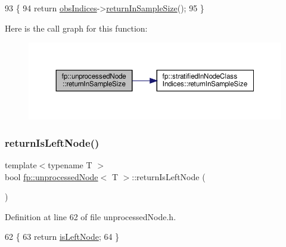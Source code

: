 \begin{DoxyCode}
93                                                \{
94                     \textcolor{keywordflow}{return} \hyperlink{classfp_1_1unprocessedNode_aba9f03124658f62906fa8ded53cef535}{obsIndices}->\hyperlink{classfp_1_1stratifiedInNodeClassIndices_a596235ffec7250fabd2818d395b39c66}{returnInSampleSize}();
95                 \}
\end{DoxyCode}
Here is the call graph for this function\+:
\nopagebreak
\begin{figure}[H]
\begin{center}
\leavevmode
\includegraphics[width=350pt]{classfp_1_1unprocessedNode_a5243ac02610f01c6b0df9d5fd6f6f857_cgraph}
\end{center}
\end{figure}
\mbox{\label{classfp_1_1unprocessedNode_a0c26b122691d15592ce80875bf8920b5}} 
\subsubsection{\texorpdfstring{return\+Is\+Left\+Node()}{returnIsLeftNode()}\hspace{0.1cm}{\footnotesize\ttfamily [1/2]}}
{\footnotesize\ttfamily template$<$typename T $>$ \\
bool \hyperlink{classfp_1_1unprocessedNode}{fp\+::unprocessed\+Node}$<$ T $>$\+::return\+Is\+Left\+Node (\begin{DoxyParamCaption}{ }\end{DoxyParamCaption})\hspace{0.3cm}{\ttfamily [inline]}}



Definition at line 62 of file unprocessed\+Node.\+h.


\begin{DoxyCode}
62                                               \{
63                     \textcolor{keywordflow}{return} \hyperlink{classfp_1_1unprocessedNode_a81b74c36ed1ac15d367e135e2fa0ba3d}{isLeftNode};
64                 \}
\end{DoxyCode}
\mbox{\label{classfp_1_1unprocessedNode_a0c26b122691d15592ce80875bf8920b5}} 
